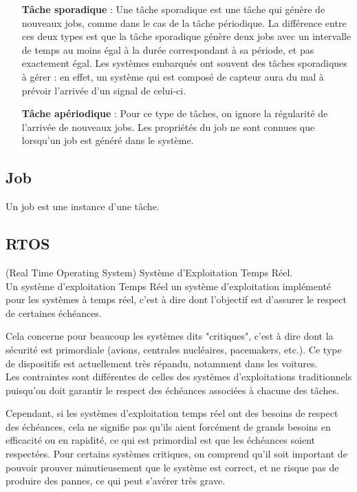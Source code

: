 \documentclass[11pt,a4paper,oneside]{report}
\begin{document}
\begin{itemize}
    \item[\textbf{Tâche sporadique}] : Une tâche sporadique est une tâche qui génère de nouveaux jobs, 
    comme dans le cas de la tâche périodique. 
    La différence entre ces deux types est que la tâche sporadique 
    génère deux jobs avec un intervalle de temps au moins égal à la durée correspondant à sa période, 
    et pas exactement égal. Les systèmes embarqués ont souvent des tâches sporadiques à gérer : 
    en effet, un système qui est composé de capteur aura du mal à prévoir l'arrivée d'un signal de 
    celui-ci. 
    
    \item[\textbf{Tâche apériodique}] : Pour ce type de tâches, on ignore la régularité de 
    l'arrivée de nouveaux jobs. Les propriétés du job ne sont connues que lorsqu'un job est 
    généré dans le système.
    
\end{itemize}

\subsection{Job}
Un job est une instance d'une tâche. 
\subsection{RTOS}
(Real Time Operating System) Système d'Exploitation Temps Réel.\\
Un système d'exploitation Temps Réel un système d'exploitation implémenté pour les systèmes 
à temps réel, c'est à dire dont l'objectif est d'assurer le respect de certaines échéances. 

Cela concerne pour beaucoup les systèmes dits "critiques", c'est à dire dont la sécurité 
est primordiale (avions, centrales nucléaires, pacemakers, etc.). Ce type de dispositifs 
est actuellement très répandu, notamment dans les voitures.\\
Les contraintes sont différentes de celles des systèmes d'exploitations traditionnels puisqu'on 
doit garantir le respect des échéances associées à chacune des tâches. 

Cependant, si les systèmes d'exploitation temps réel ont des besoins de respect des échéances, 
cela ne signifie pas qu'ils aient forcément de grands besoins en efficacité ou en rapidité, ce qui 
est primordial est que les échéances soient respectées. 
Pour certains systèmes critiques, on comprend qu'il soit important de pouvoir prouver 
minutieusement que le système est correct, et ne risque pas de produire des pannes, ce qui peut 
s'avérer très grave. \\
	
\end{document}
